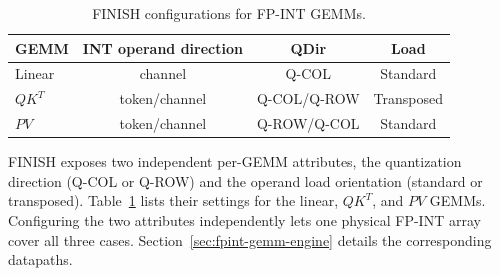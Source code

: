 \documentclass[sigconf,anonymous,nonacm]{acmart}
\newcommand{\ours}{\textsc{FINISH}}
\newcommand{\fpint}{FP-INT}
\newcommand{\qcol}{Q-COL}
\newcommand{\qrow}{Q-ROW}
\begin{document}
\begin{table}[t]
  \centering
  \caption{FINISH configurations for FP-INT GEMMs.}
  \label{tab:gemm-config}
  \renewcommand{\arraystretch}{0.95}
  \begin{tabular*}{\columnwidth}
    {@{\extracolsep{\fill}}lccc@{}}
  \toprule
  GEMM & INT operand direction & QDir & Load \\
  \midrule
  Linear & channel        & Q-COL & Standard \\
  $QK^T$ & token/channel  & Q-COL/Q-ROW & Transposed \\
  $PV$   & token/channel  & Q-ROW/Q-COL & Standard \\
  \bottomrule
  \end{tabular*}
\end{table}

\ours{} exposes two independent per-GEMM attributes, the quantization direction (Q-COL or Q-ROW) and the operand load orientation (standard or transposed). Table~\ref{tab:gemm-config} lists their settings for the linear, $QK^T$, and $PV$ GEMMs. Configuring the two attributes independently lets one physical FP-INT array cover all three cases. Section~\ref{sec:fpint-gemm-engine} details the corresponding datapaths.
\end{document}
